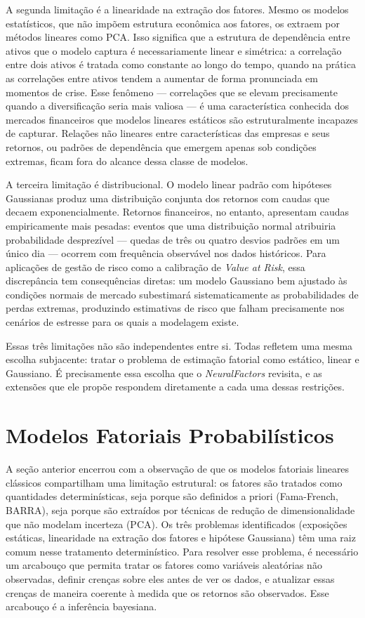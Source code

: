 A segunda limitação é a linearidade na extração dos fatores. Mesmo os modelos estatísticos, que não impõem estrutura econômica aos fatores, os extraem por métodos lineares como PCA. Isso significa que a estrutura de dependência entre ativos que o modelo captura é necessariamente linear e simétrica: a correlação entre dois ativos é tratada como constante ao longo do tempo, quando na prática as correlações entre ativos tendem a aumentar de forma pronunciada em momentos de crise. Esse fenômeno — correlações que se elevam precisamente quando a diversificação seria mais valiosa — é uma característica conhecida dos mercados financeiros que modelos lineares estáticos são estruturalmente incapazes de capturar. Relações não lineares entre características das empresas e seus retornos, ou padrões de dependência que emergem apenas sob condições extremas, ficam fora do alcance dessa classe de modelos.
 
A terceira limitação é distribucional. O modelo linear padrão com hipóteses Gaussianas produz uma distribuição conjunta dos retornos com caudas que decaem exponencialmente. Retornos financeiros, no entanto, apresentam caudas empiricamente mais pesadas: eventos que uma distribuição normal atribuiria probabilidade desprezível — quedas de três ou quatro desvios padrões em um único dia — ocorrem com frequência observável nos dados históricos. Para aplicações de gestão de risco como a calibração de \textit{Value at Risk}, essa discrepância tem consequências diretas: um modelo Gaussiano bem ajustado às condições normais de mercado subestimará sistematicamente as probabilidades de perdas extremas, produzindo estimativas de risco que falham precisamente nos cenários de estresse para os quais a modelagem existe.
 
Essas três limitações não são independentes entre si. Todas refletem uma mesma escolha subjacente: tratar o problema de estimação fatorial como estático, linear e Gaussiano. É precisamente essa escolha que o \textit{NeuralFactors} revisita, e as extensões que ele propõe respondem diretamente a cada uma dessas restrições.

\section{Modelos Fatoriais Probabilísticos}

A seção anterior encerrou com a observação de que os modelos fatoriais lineares clássicos compartilham uma limitação estrutural: os fatores são tratados como quantidades determinísticas, seja porque são definidos a priori (Fama-French, BARRA), seja porque são extraídos por técnicas de redução de dimensionalidade que não modelam incerteza (PCA). Os três problemas identificados (exposições estáticas, linearidade na extração dos fatores e hipótese Gaussiana) têm uma raiz comum nesse tratamento determinístico. Para resolver esse problema, é necessário um arcabouço que permita tratar os fatores como variáveis aleatórias não observadas, definir crenças sobre eles antes de ver os dados, e atualizar essas crenças de maneira coerente à medida que os retornos são observados. Esse arcabouço é a inferência bayesiana.

